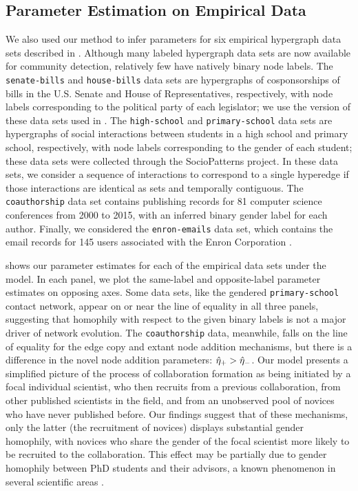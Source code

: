 \documentclass[aps,pre,reprint,superscriptaddress,nofootinbib]{revtex4-2}
\begin{document}
\subsection{Parameter Estimation on Empirical Data} \label{sec:sem-empirical}

We also used our method to infer parameters for six empirical hypergraph data sets described in . 
Although many labeled hypergraph data sets are now available for community detection, relatively few have natively binary node labels. 
The \texttt{senate-bills} and \texttt{house-bills} data sets \cite{fowler2006connecting,fowler2006legislative} are hypergraphs of cosponsorships of bills in the U.S. Senate and House of Representatives, respectively, with node labels corresponding to the political party of each legislator; we use the version of these data sets used in \cite{chodrowGenerativeHypergraphClustering2021}.
The \texttt{high-school} and \texttt{primary-school} data sets \cite{gemmetto2014mitigation,stehle2011high,mastrandrea2015contact} are hypergraphs of social interactions between students in a high school and primary school, respectively, with node labels corresponding to the gender of each student; these data sets were collected through the SocioPatterns project.
In these data sets, we consider a sequence of interactions to correspond to a single hyperedge if those interactions are identical as sets and temporally contiguous. 
The \texttt{coauthorship} data set \cite{agarwal2016women} contains publishing records for 81 computer science conferences from 2000 to 2015, with an inferred binary gender label for each author.
Finally, we considered the \texttt{enron-emails} data set, which contains the email records for 145 users associated with the Enron Corporation \cite{klimt2004enron}.


 shows our parameter estimates for each of the empirical data sets under the \model{} model. 
In each panel, we plot the same-label and opposite-label parameter estimates on opposing axes. 
Some data sets, like the gendered \texttt{primary-school} contact network, appear on or near the line of equality in all three panels, suggesting that homophily with respect to the given binary labels is not a major driver of network evolution. 
The \texttt{coauthorship} data, meanwhile, falls on the line of equality for the edge copy and extant node addition mechanisms, but there is a difference in the novel node addition parameters: $\hat{\eta}_+ > \hat{\eta}_-$.
Our model presents a simplified picture of the process of collaboration formation as being initiated by a focal individual scientist, who then recruits from a previous collaboration, from other published scientists in the field, and from an unobserved pool of novices who have never published before. 
Our findings suggest that of these mechanisms, only the latter (the recruitment of novices) displays substantial gender homophily, with novices who share the gender of the focal scientist more likely to be recruited to the collaboration. 
This effect may be partially due to gender homophily between PhD students and their advisors, a known phenomenon in several scientific areas \cite{schwartz2022impact}. 
\end{document}

